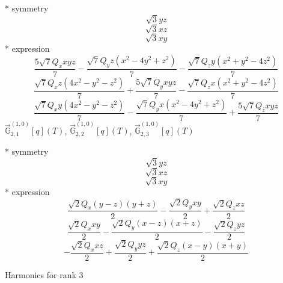 \documentclass[fleqn,8pt]{jsarticle}
\begin{document}
\noindent\quad ** symmetry
\begin{dmath*}
\sqrt{3} y z
\end{dmath*}
\begin{dmath*}
\sqrt{3} x z
\end{dmath*}
\begin{dmath*}
\sqrt{3} x y
\end{dmath*}
\noindent\quad ** expression
\begin{dmath*}
\frac{5 \sqrt{7} Q_{x} x y z}{7} - \frac{\sqrt{7} Q_{y} z \left(x^{2} - 4 y^{2} + z^{2}\right)}{7} - \frac{\sqrt{7} Q_{z} y \left(x^{2} + y^{2} - 4 z^{2}\right)}{7}
\end{dmath*}
\begin{dmath*}
\frac{\sqrt{7} Q_{x} z \left(4 x^{2} - y^{2} - z^{2}\right)}{7} + \frac{5 \sqrt{7} Q_{y} x y z}{7} - \frac{\sqrt{7} Q_{z} x \left(x^{2} + y^{2} - 4 z^{2}\right)}{7}
\end{dmath*}
\begin{dmath*}
\frac{\sqrt{7} Q_{x} y \left(4 x^{2} - y^{2} - z^{2}\right)}{7} - \frac{\sqrt{7} Q_{y} x \left(x^{2} - 4 y^{2} + z^{2}\right)}{7} + \frac{5 \sqrt{7} Q_{z} x y z}{7}
\end{dmath*}
\noindent\quad $\vec{\mathbb{G}}_{2,1}^{(1,0)}[q](T)$, $\vec{\mathbb{G}}_{2,2}^{(1,0)}[q](T)$, $\vec{\mathbb{G}}_{2,3}^{(1,0)}[q](T)$

\noindent\quad ** symmetry
\begin{dmath*}
\sqrt{3} y z
\end{dmath*}
\begin{dmath*}
\sqrt{3} x z
\end{dmath*}
\begin{dmath*}
\sqrt{3} x y
\end{dmath*}
\noindent\quad ** expression
\begin{dmath*}
\frac{\sqrt{2} Q_{x} \left(y - z\right) \left(y + z\right)}{2} - \frac{\sqrt{2} Q_{y} x y}{2} + \frac{\sqrt{2} Q_{z} x z}{2}
\end{dmath*}
\begin{dmath*}
\frac{\sqrt{2} Q_{x} x y}{2} - \frac{\sqrt{2} Q_{y} \left(x - z\right) \left(x + z\right)}{2} - \frac{\sqrt{2} Q_{z} y z}{2}
\end{dmath*}
\begin{dmath*}
- \frac{\sqrt{2} Q_{x} x z}{2} + \frac{\sqrt{2} Q_{y} y z}{2} + \frac{\sqrt{2} Q_{z} \left(x - y\right) \left(x + y\right)}{2}
\end{dmath*}

\noindent * Harmonics for rank 3
\end{document}
